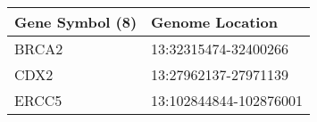 \begin{tabular}{ll}
\toprule
Gene Symbol (8) &        Genome Location \\
\midrule
          BRCA2 &   13:32315474-32400266 \\
           CDX2 &   13:27962137-27971139 \\
          ERCC5 & 13:102844844-102876001 \\
\bottomrule
\end{tabular}
